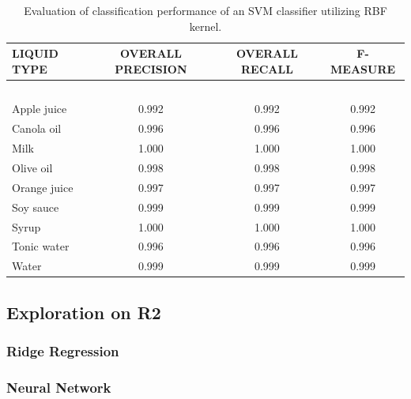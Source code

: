 \documentclass{article} %
\begin{document}
\begin{table}[t]
\caption{Evaluation of classification performance of an SVM classifier utilizing RBF kernel.}
\label{table:svmEval}
\begin{center}
\begin{tabular}{ l | c | c | c }
\textbf{LIQUID TYPE} & \textbf{OVERALL PRECISION} & \textbf{OVERALL RECALL} & \textbf{F-MEASURE} \\ \hline
~ & ~ & ~ & ~\\
Apple juice & 0.992 & 0.992 & 0.992 \\
Canola oil & 0.996 & 0.996 & 0.996 \\
Milk & 1.000 & 1.000 & 1.000 \\
Olive oil & 0.998 & 0.998 & 0.998 \\
Orange juice & 0.997 & 0.997 & 0.997 \\
Soy sauce & 0.999 & 0.999 & 0.999 \\
Syrup & 1.000 & 1.000 & 1.000 \\
Tonic water & 0.996 & 0.996 & 0.996 \\
Water & 0.999 & 0.999 & 0.999 \\
\end{tabular}
\end{center}
\end{table}
\subsection{Exploration on R2}

\subsubsection{Ridge Regression}

\subsubsection{Neural Network}
\end{document}

